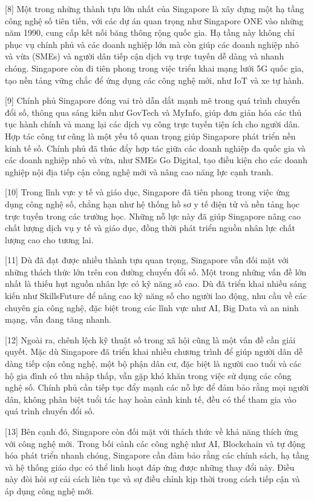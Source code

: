 \documentclass[12pt,a4paper,twoside]{article}
\newenvironment{readingpassage}[1][]{%
    \begin{tcolorbox}[enhanced, colback=grayLight, colframe=secondaryBlue,
        coltitle=textDark, fonttitle=\bfseries, title={#1},
        rounded corners, arc=3mm, boxrule=1pt,
        left=15pt, right=15pt, top=10pt, bottom=10pt,
        breakable, before skip=10pt, after skip=10pt, drop fuzzy shadow]
    \setstretch{1.3}
}{\end{tcolorbox}}
\begin{document}
\begin{readingpassage}[]
[8] Một trong những thành tựu lớn nhất của Singapore là xây dựng một hạ tầng công nghệ số tiên tiến, với các dự án quan trọng như Singapore ONE vào những năm 1990, cung cấp kết nối băng thông rộng quốc gia. Hạ tầng này không chỉ phục vụ chính phủ và các doanh nghiệp lớn mà còn giúp các doanh nghiệp nhỏ và vừa (SMEs) và người dân tiếp cận dịch vụ trực tuyến dễ dàng và nhanh chóng. Singapore còn đi tiên phong trong việc triển khai mạng lưới 5G quốc gia, tạo nền tảng vững chắc để ứng dụng các công nghệ mới, như IoT và xe tự hành.

[9] Chính phủ Singapore đóng vai trò dẫn dắt mạnh mẽ trong quá trình chuyển đổi số, thông qua sáng kiến như GovTech và MyInfo, giúp đơn giản hóa các thủ tục hành chính và mang lại các dịch vụ công trực tuyến tiện ích cho người dân. Hợp tác công tư cũng là một yếu tố quan trọng giúp Singapore phát triển nền kinh tế số. Chính phủ đã thúc đẩy hợp tác giữa các doanh nghiệp đa quốc gia và các doanh nghiệp nhỏ và vừa, như SMEs Go Digital, tạo điều kiện cho các doanh nghiệp nội địa tiếp cận công nghệ mới và nâng cao năng lực cạnh tranh.

[10] Trong lĩnh vực y tế và giáo dục, Singapore đã tiên phong trong việc ứng dụng công nghệ số, chẳng hạn như hệ thống hồ sơ y tế điện tử và nền tảng học trực tuyến trong các trường học. Những nỗ lực này đã giúp Singapore nâng cao chất lượng dịch vụ y tế và giáo dục, đồng thời phát triển nguồn nhân lực chất lượng cao cho tương lai.

[11] Dù đã đạt được nhiều thành tựu quan trọng, Singapore vẫn đối mặt với những thách thức lớn trên con đường chuyển đổi số. Một trong những vấn đề lớn nhất là thiếu hụt nguồn nhân lực có kỹ năng số cao. Dù đã triển khai nhiều sáng kiến như SkillsFuture để nâng cao kỹ năng số cho người lao động, nhu cầu về các chuyên gia công nghệ, đặc biệt trong các lĩnh vực như AI, Big Data và an ninh mạng, vẫn đang tăng nhanh.

[12] Ngoài ra, chênh lệch kỹ thuật số trong xã hội cũng là một vấn đề cần giải quyết. Mặc dù Singapore đã triển khai nhiều chương trình để giúp người dân dễ dàng tiếp cận công nghệ, một bộ phận dân cư, đặc biệt là người cao tuổi và các hộ gia đình có thu nhập thấp, vẫn gặp khó khăn trong việc sử dụng các công nghệ số. Chính phủ cần tiếp tục đẩy mạnh các nỗ lực để đảm bảo rằng mọi người dân, không phân biệt tuổi tác hay hoàn cảnh kinh tế, đều có thể tham gia vào quá trình chuyển đổi số.

[13] Bên cạnh đó, Singapore còn đối mặt với thách thức về khả năng thích ứng với công nghệ mới. Trong bối cảnh các công nghệ như AI, Blockchain và tự động hóa phát triển nhanh chóng, Singapore cần đảm bảo rằng các chính sách, hạ tầng và hệ thống giáo dục có thể linh hoạt đáp ứng được những thay đổi này. Điều này đòi hỏi sự cải cách liên tục và sự điều chỉnh kịp thời trong cách tiếp cận và áp dụng công nghệ mới.


\end{readingpassage}
\end{document}
